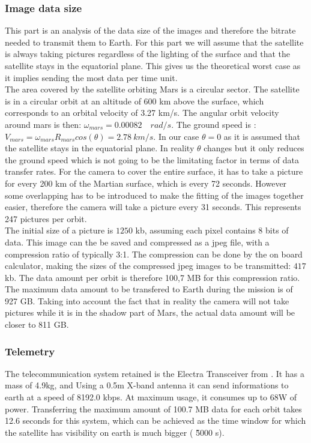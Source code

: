 \documentclass[a4paper, oneside, 11pt]{article}
\begin{document}
\subsubsection{Image data size}This part is an analysis of the data size of the images and therefore the bitrate needed to transmit them to Earth. For this part we will assume that the satellite is always taking pictures regardless of the lighting of the surface and that the satellite stays in the equatorial plane. This gives us the theoretical worst case as it implies sending the most data per time unit.\\
The area covered by the satellite orbiting Mars is a circular sector.
The satellite is in a circular orbit at an altitude of 600 km above the surface, which corresponds to an orbital velocity of 3.27 km/s. The angular orbit velocity around mars is then: $\omega_{mars}=0.00082\quad rad/s$. The ground speed is :  $V_{mars}=\omega_{mars} R_{mars}cos(\theta) = 2.78 \ km/s$. In our case $\theta = 0$ as it is assumed that the satellite stays in the equatorial plane. In reality $\theta$ changes but it only reduces the ground speed which is not going to be the limitating factor in terms of data transfer rates.  For the camera to cover the entire surface, it has to take a picture for every 200 km of the Martian surface, which is every 72 seconds. However  some overlapping has to be introduced to make the fitting of the images together easier, therefore the camera will take a picture every 31 seconds. This represents 247 pictures per orbit.\\
The initial size of a picture is $1250$ kb, assuming each pixel contains 8 bits of data. This image can the be saved and compressed as a jpeg file, with a compression ratio of typically 3:1. The compression can be done by the on board calculator, making the sizes of the compressed jpeg images to be transmitted: $417$ kb. The data amount per orbit is therefore 100,7 MB  for this compression ratio. The maximum data amount to be transfered to Earth during the mission is of 927 GB. Taking into account the fact that in reality the camera will not take pictures while it is in the shadow part of Mars, the actual data amount will be closer to 811 GB.

\subsubsection{Telemetry}
The telecommunication system retained is the  Electra Transceiver from \cite{Electra}. It has a  mass of 4.9kg, and Using a 0.5m X-band antenna it can send informations to earth at a speed of 8192.0 kbps. At maximum usage, it consumes up to 68W of power. Transferring the maximum amount of 100.7 MB data for each orbit takes 12.6 seconds for this system, which can be achieved as the time window for which the satellite has visibility on earth is much bigger ( \~ 5000 s). 
\end{document}
